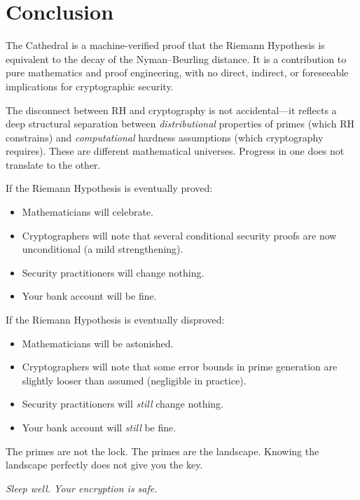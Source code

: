 \documentclass[11pt,a4paper]{article}
\begin{document}
\section{Conclusion}
\label{sec:conclusion}

The Cathedral is a machine-verified proof that the Riemann Hypothesis
is equivalent to the decay of the Nyman--Beurling distance. It is a
contribution to pure mathematics and proof engineering, with no
direct, indirect, or foreseeable implications for cryptographic
security.

The disconnect between RH and cryptography is not accidental---it
reflects a deep structural separation between \emph{distributional}
properties of primes (which RH constrains) and \emph{computational}
hardness assumptions (which cryptography requires). These are
different mathematical universes. Progress in one does not translate
to the other.

If the Riemann Hypothesis is eventually proved:
\begin{itemize}
  \item Mathematicians will celebrate.
  \item Cryptographers will note that several conditional security
    proofs are now unconditional (a mild strengthening).
  \item Security practitioners will change nothing.
  \item Your bank account will be fine.
\end{itemize}

If the Riemann Hypothesis is eventually disproved:
\begin{itemize}
  \item Mathematicians will be astonished.
  \item Cryptographers will note that some error bounds in prime
    generation are slightly looser than assumed (negligible in
    practice).
  \item Security practitioners will \emph{still} change nothing.
  \item Your bank account will \emph{still} be fine.
\end{itemize}

The primes are not the lock. The primes are the landscape.
Knowing the landscape perfectly does not give you the key.

\vspace{0.5cm}
\begin{flushright}
\emph{Sleep well. Your encryption is safe.}
\end{flushright}
\end{document}
